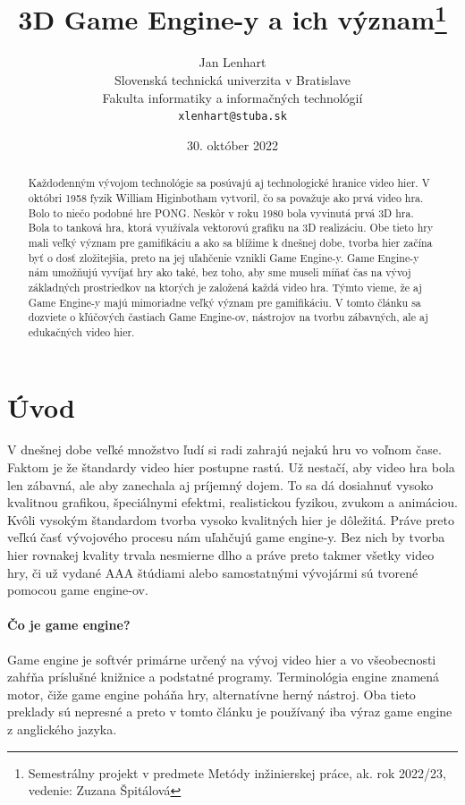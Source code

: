 \documentclass[10pt,oneside,slovak,a4paper,hidelinks]{article}
\title{3D Game Engine-y a ich význam\thanks{Semestrálny projekt v predmete Metódy inžinierskej práce, ak. rok 2022/23, vedenie: Zuzana Špitálová}} %
\author{Jan Lenhart\\[2pt]
	{\small Slovenská technická univerzita v Bratislave}\\
	{\small Fakulta informatiky a informačných technológií}\\
	{\small \texttt{xlenhart@stuba.sk}}
}
\date{\small 30. október 2022} %
\begin{document}
	
	\maketitle
	
	\vspace*{\fill}
	\begin{abstract}
		Každodenným vývojom technológie sa posúvajú aj technologické hranice video hier. V októbri 1958 fyzik William Higinbotham vytvoril, čo sa považuje ako prvá video hra. Bolo to niečo podobné hre PONG. Neskôr v roku 1980 bola vyvinutá prvá 3D hra. Bola to tanková hra, ktorá využívala vektorovú grafiku na 3D realizáciu. Obe tieto hry mali veľký význam pre gamifikáciu a ako sa blížime k dnešnej dobe, tvorba hier začína byť o dosť zložitejšia, preto na jej uľahčenie vznikli Game Engine-y. Game Engine-y nám umožňujú vyvíjať hry ako také, bez toho, aby sme museli míňať čas na vývoj základných prostriedkov na ktorých je založená každá video hra. Týmto vieme, že aj Game Engine-y majú mimoriadne veľký význam pre gamifikáciu. V tomto článku sa dozviete o kľúčových častiach Game Engine-ov, nástrojov na tvorbu zábavných, ale aj edukačných video hier.
	\end{abstract}
	\vspace*{\fill}
	
	\pagebreak
	
	\section{Úvod}
		V dnešnej dobe veľké množstvo ľudí si radi zahrajú nejakú hru vo voľnom čase. Faktom je že štandardy video hier postupne rastú. Už nestačí, aby video hra bola len zábavná, ale aby zanechala aj príjemný dojem. To sa dá dosiahnuť vysoko kvalitnou grafikou, špeciálnymi efektmi, realistickou fyzikou, zvukom a animáciou. Kvôli vysokým štandardom tvorba vysoko kvalitných hier je dôležitá. Práve preto veľkú časť vývojového procesu nám uľahčujú game engine-y. Bez nich by tvorba hier rovnakej kvality trvala nesmierne dlho a práve preto takmer všetky video hry, či už vydané AAA štúdiami alebo samostatnými vývojármi sú tvorené pomocou game engine-ov.
		\paragraph{Čo je game engine?} Game engine je softvér primárne určený na vývoj video hier a vo všeobecnosti zahŕňa príslušné knižnice a podstatné programy. Terminológia engine znamená motor, čiže game engine poháňa hry, alternatívne herný nástroj. Oba tieto preklady sú nepresné a preto v tomto článku je používaný iba výraz game engine z anglického jazyka.
\end{document}
